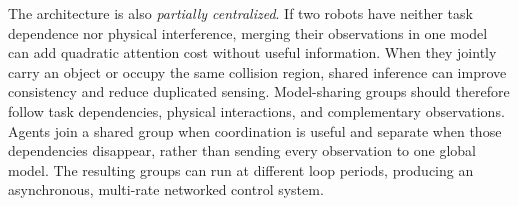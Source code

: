 \documentclass[letterpaper,journal]{IEEEtran}
\begin{document}

The architecture is also \emph{partially centralized}. If two robots have
neither task dependence nor physical interference, merging their observations
in one model can add quadratic attention cost without useful information.
When they jointly carry an object or occupy the same collision region,
shared inference can improve consistency and reduce duplicated sensing.
Model-sharing groups should therefore follow task dependencies, physical
interactions, and complementary observations. Agents join a shared group when
coordination is useful and separate when those dependencies disappear, rather
than sending every observation to one global model. The resulting groups can run
at different loop periods, producing an asynchronous, multi-rate networked
control system.
\end{document}
